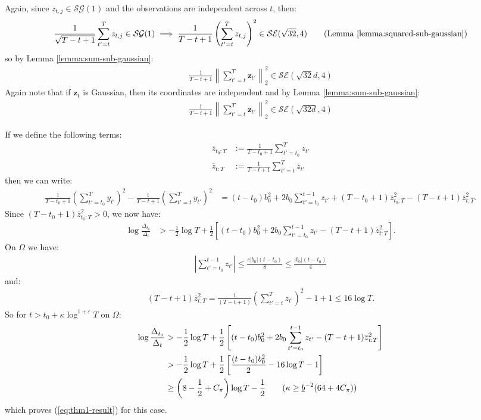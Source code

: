 \documentclass{article}
\begin{document}
Again, since $z_{t,j} \in \mathcal{SG}(1)$ and the observations are independent across $t$, then:
\begin{align*}
    \frac{1}{\sqrt{T-t+1}}\sum_{t'=t}^T z_{t,j} \in \mathcal{SG}(1) \implies \frac{1}{T-t+1}\left(\sum_{t'=t}^T z_{t,j}\right)^2 \in \mathcal{SE}(\sqrt{32}, 4) \tag{Lemma \ref{lemma:squared-sub-gaussian}}
\end{align*}
so by Lemma \ref{lemma:sum-sub-gaussian}:
\begin{align*}
    \frac{1}{T-t+1}\left\lVert\sum_{t'=t}^T\mathbf{z}_{t'}\right\rVert_2^2 \in \mathcal{SE}(\sqrt{32}d, 4)
\end{align*}
Again note that if $\mathbf{z}_t$ is Gaussian, then its coordinates are independent and by Lemma \ref{lemma:sum-sub-gaussian}:
\begin{align*}
    \frac{1}{T-t+1}\left\lVert\sum_{t'=t}^T\mathbf{z}_{t'}\right\rVert_2^2 \in \mathcal{SE}(\sqrt{32d}, 4)
\end{align*}

If we define the following terms:
\begin{align*}
    \overline{z}_{t_0:T} &:= \frac{1}{T-t_0+1}\sum_{t'=t_0}^T z_{t'} \\
    \overline{z}_{t:T} &:= \frac{1}{T-t+1}\sum_{t'=t}^T z_{t'}
\end{align*}
then we can write:
\small
\begin{align*}
    \frac{1}{T-t_0+1}\left(\sum_{t'=t_0}^{T} y_{t'}\right)^2- \frac{1}{T-t+1}\left(\sum_{t'=t}^{T} y_{t'}\right)^2 &= (t-t_0)b_0^2 + 2b_0\sum_{t'=t_0}^{t-1}z_{t'} + (T-t_0+1) \overline{z}^2_{t_0:T} - (T-t+1)\overline{z}^2_{t:T}.
\end{align*}
\normalsize
Since $(T-t_0+1) \overline{z}^2_{t_0:T} > 0$, we now have: 
\begin{align*}
    \log \frac{\Delta_{t_0}}{\Delta_t} &> -\frac{1}{2} \log T + \frac{1}{2} \left[(t-t_0)b_0^2 + 2b_0\sum_{t'=t_0}^{t-1}z_{t'} - (T-t+1)\overline{z}^2_{t:T}\right].
\end{align*}
On $\Omega$ we have:
\begin{align*}
    \left|\sum_{t'=t_0}^{t-1}z_{t'}\right| \leq \frac{c|b_0|(t-t_0)}{8} \leq \frac{|b_0|(t-t_0)}{4}
\end{align*}
and:
\begin{align*}
    (T-t+1)\overline{z}^2_{t:T} = \frac{1}{(T-t+1)}\left(\sum_{t'=t}^T z_{t'}\right)^2 - 1 +1 \leq 16\log T.
\end{align*}
So for $t > t_0 + \kappa \log^{1+\varepsilon} T$ on $\Omega$:
\begin{align*}
    \log \frac{\Delta_{t_0}}{\Delta_t}  &> -\frac{1}{2} \log T + \frac{1}{2} \left[(t-t_0)b_0^2 + 2b_0\sum_{t'=t_0}^{t-1}z_{t'} - (T-t+1)\overline{z}^2_{t:T}\right]\\
    &> -\frac{1}{2} \log T + \frac{1}{2} \left[\frac{(t-t_0)b_0^2 }{2}- 16 \log T -1\right]  \\
    &\geq \left(8 - \frac{1}{2} + C_\pi\right) \log T - \frac{1}{2} \tag{$\kappa \geq \underline{b}^{-2}(64 + 4 C_\pi)$} 
\end{align*}
which proves (\ref{eq:thm1-result}) for this case.
\end{document}
